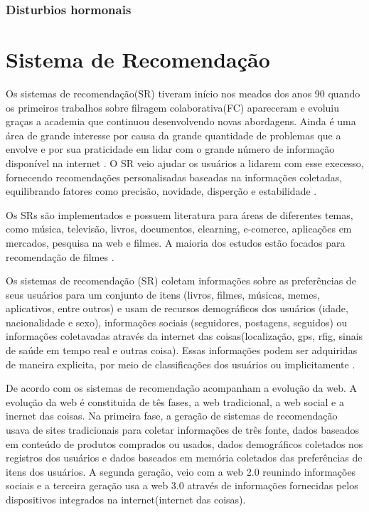 \subsubsection{Disturbios hormonais}

\section{Sistema de Recomendação}

Os sistemas de recomendação(SR) tiveram início nos meados dos anos 90 quando os primeiros trabalhos sobre filragem colaborativa(FC) apareceram \cite{felferning2008} e evoluiu graças a academia que continuou desenvolvendo novas abordagens. Ainda é uma área de grande interesse por causa da grande quantidade de problemas que a envolve e por sua praticidade em lidar com o grande número de informação disponível na internet \cite{adomavicius2005}. O SR veio ajudar os usuários a lidarem com esse execesso, fornecendo recomendações personalisadas baseadas na informações coletadas, equilibrando fatores como precisão, novidade, disperção e estabilidade\cite{bobadilla2013} .

Os SRs são implementados e possuem literatura para áreas de diferentes temas, como música, televisão, livros, documentos, elearning, e-comerce, aplicações em mercados, pesquisa na web e filmes. A maioria dos estudos estão focados para recomendação de filmes \cite{bobadilla2013}.

Os sistemas de recomendação (SR) coletam informações sobre as preferências de seus usuários para um conjunto de itens (livros, filmes, músicas, memes, aplicativos, entre outros) e usam de recursos demográficos dos usuários (idade, nacionalidade e sexo), informações sociais (seguidores, postagens, seguidos) ou informações coletavadas através da internet das coisas(localização, gps, rfig, sinais de saúde em tempo real e outras coisa). Essas informações podem ser adquiridas de maneira explicita, por meio de classificações dos usuários ou implicitamente \cite{bobadilla2013}. 


De acordo com  os sistemas de recomendação acompanham a evolução da web. A evolução da web é constituida de tês fases, a web tradicional, a web social e a inernet das coisas. Na primeira fase, a geração de sistemas de recomendação usava de sites tradicionais para coletar informações de três fonte, dados baseados em conteúdo de produtos comprados ou usados, dados demográficos coletados nos registros dos usuários e dados baseados em memória coletados das preferências de itens dos usuários. A segunda geração, veio com a web 2.0 reunindo informações sociais e a terceira geração usa a web 3.0 através de informações fornecidas pelos dispositivos integrados na internet(internet das coisas).

